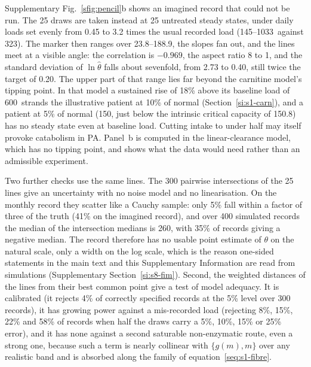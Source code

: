 Supplementary Fig.~\ref{sfig:pencil}b shows an imagined record that could not be run. The 25
draws are taken instead at 25 untreated steady states, under daily loads set evenly from 0.45
to 3.2 times the usual recorded load (145--1033\um\ against 323\um). The marker then ranges
over 23.8--188.9\uM, the slopes fan out, and the lines meet at a visible angle: the
correlation is $-0.969$, the aspect ratio 8 to 1, and the standard deviation of
$\ln\hat\theta$ falls about sevenfold, from 2.73 to 0.40, still twice the target of 0.20. The
upper part of that range lies far beyond the carnitine model's tipping point. In that model
a sustained rise of 18\% above its baseline load of 600\um\ strands the illustrative patient
at 10\% of normal (Section~\ref{si:s1-carn}), and a patient at 5\% of normal (150\um, just
below the intrinsic critical capacity of 150.8\um) has no steady state even at baseline
load. Cutting intake to under half may itself provoke catabolism in PA. Panel~b is computed
in the linear-clearance model, which has no tipping point, and shows what the data would
need rather than an admissible experiment.

Two further checks use the same lines. The 300 pairwise intersections of the 25 lines give
an uncertainty with no noise model and no linearisation. On the monthly record they scatter
like a Cauchy sample: only 5\% fall within a factor of three of the truth (41\% on the
imagined record), and over 400 simulated records the median of the intersection medians is
260\um, with 35\% of records giving a negative median. The record therefore has no usable
point estimate of $\theta$ on the natural scale, only a width on the log scale, which is the
reason one-sided statements in the main text and this Supplementary Information are read
from simulations (Supplementary Section~\ref{si:s8-fim}). Second, the weighted distances of the lines from their
best common point give a test of model adequacy. It is calibrated (it rejects 4\% of
correctly specified records at the 5\% level over 300 records), it has growing power
against a mis-recorded load (rejecting 8\%, 15\%, 22\% and 58\% of records when half the draws
carry a 5\%, 10\%, 15\% or 25\% error), and it has none against a second saturable
non-enzymatic route, even a strong one, because such a term is nearly collinear with
$\{g(m),m\}$ over any realistic band and is absorbed along the family of
equation~\eqref{seq:s1-fibre}.

